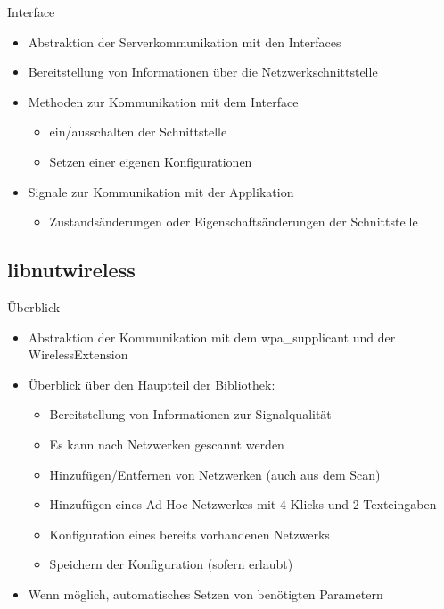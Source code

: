 \begin{frame}[<+-| alert@+>]{Interface}
	\begin{itemize}
		\item Abstraktion der Serverkommunikation mit den Interfaces
		\item Bereitstellung von Informationen über die Netzwerkschnittstelle
		\item Methoden zur Kommunikation mit dem Interface
		\begin{itemize}
			\item ein/ausschalten der Schnittstelle
			\item Setzen einer eigenen Konfigurationen
		\end{itemize}
		\item Signale zur Kommunikation mit der Applikation
		\begin{itemize}
			\item Zustandsänderungen oder Eigenschaftsänderungen der Schnittstelle
		\end{itemize}
	\end{itemize}
\end{frame}

\subsection{libnutwireless}
\begin{frame}[<+-| alert@+>]{Überblick}
	\begin{itemize}
		\item Abstraktion der Kommunikation mit dem wpa\_supplicant und der WirelessExtension
		\item Überblick über den Hauptteil der Bibliothek:
		\begin{itemize}
			\item Bereitstellung von Informationen zur Signalqualität
			\item Es kann nach Netzwerken gescannt werden
			\item Hinzufügen/Entfernen von Netzwerken (auch aus dem Scan)
			\item Hinzufügen eines Ad-Hoc-Netzwerkes mit 4 Klicks und 2 Texteingaben
			\item Konfiguration eines bereits vorhandenen Netzwerks
			\item Speichern der Konfiguration (sofern erlaubt)
		\end{itemize}
		\item Wenn möglich, automatisches Setzen von benötigten Parametern
	\end{itemize}
\end{frame}
